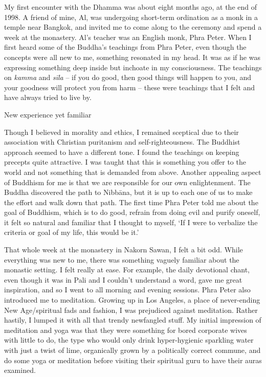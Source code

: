
My first encounter with the Dhamma was about eight months ago, at the
end of 1998. A friend of mine, Al, was undergoing short-term ordination
as a monk in a temple near Bangkok, and invited me to come along to the
ceremony and spend a week at the monastery. Al's teacher was an English
monk, Phra Peter. When I first heard some of the Buddha's teachings from
Phra Peter, even though the concepts were all new to me, something
resonated in my head. It was as if he was expressing something deep
inside but inchoate in my consciousness. The teachings on \emph{kamma}
and \emph{sīla} -- if you do good, then good things will happen to you, 
and your goodness will protect you from harm -- these were teachings
that I felt and have always tried to live by. 

New experience yet familiar

Though I believed in morality and ethics, I remained sceptical due to
their association with Christian puritanism and self-righteousness. The
Buddhist approach seemed to have a different tone. I found the teachings
on keeping precepts quite attractive. I was taught that this is
something you offer to the world and not something that is demanded from
above. Another appealing aspect of Buddhism for me is that we are
responsible for our own enlightenment. The Buddha discovered the path to
Nibbāna, but it is up to each one of us to make the effort and walk down
that path. The first time Phra Peter told me about the goal of Buddhism, 
which is to do good, refrain from doing evil and purify oneself, it felt
so natural and familiar that I thought to myself, `If I were to
verbalize the criteria or goal of my life, this would be it.'

That whole week at the monastery in Nakorn Sawan, I felt a bit odd. 
While everything was new to me, there was something vaguely familiar
about the monastic setting. I felt really at ease. For example, the
daily devotional chant, even though it was in Pali and I couldn't
understand a word, gave me great inspiration, and so I went to all
morning and evening sessions. Phra Peter also introduced me to
meditation. Growing up in Los Angeles, a place of never-ending New
Age/spiritual fads and fashion, I was prejudiced against meditation. 
Rather hastily, I lumped it with all that trendy newfangled stuff. My
initial impression of meditation and yoga was that they were something
for bored corporate wives with little to do, the type who would only
drink hyper-hygienic sparkling water with just a twist of lime, 
organically grown by a politically correct commune, and do some yoga or
meditation before visiting their spiritual guru to have their auras
examined. 

